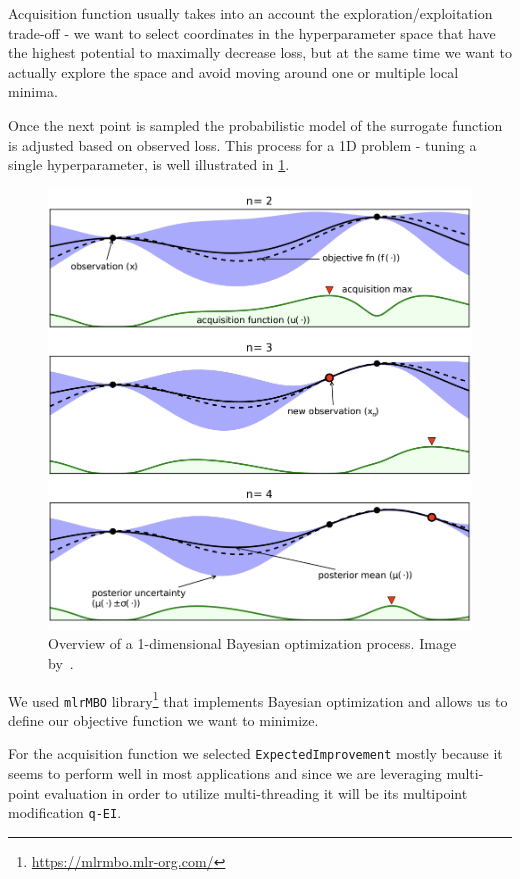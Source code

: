 Acquisition function usually takes into an account the exploration/exploitation trade-off - we want to select coordinates in the hyperparameter space that have the highest potential to maximally decrease loss, but at the same time we want to actually explore the space and avoid moving around one or multiple local minima. 

Once the next point is sampled the probabilistic model of the surrogate function is adjusted based on observed loss\cite{Bayes2016}. This process for a 1D problem - tuning a single hyperparameter, is well illustrated in \cref{fig:bayes_opt}.

\begin{figure}
  \includegraphics[width=120mm]{img/Bayes_opt.png}
  \caption{Overview of a 1-dimensional Bayesian optimization process. Image by~\citet{Bayes2016}.}
  \label{fig:bayes_opt}
\end{figure}

We used \texttt{mlrMBO} library\footnote{\url{https://mlrmbo.mlr-org.com/}} that implements Bayesian optimization and allows us to define our objective function we want to minimize. 

For the acquisition function we selected \texttt{ExpectedImprovement} mostly because it seems to perform well in most applications\cite{Bayes2016} and since we are leveraging multi-point evaluation in order to utilize multi-threading it will be its multipoint modification \texttt{q-EI}\cite{bayes_multipoint}.

